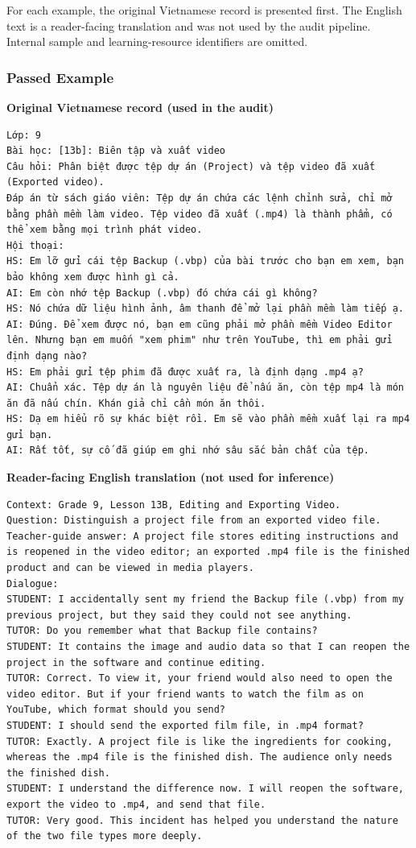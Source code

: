 \documentclass[conference]{IEEEtran}
\begin{document}
For each example, the original Vietnamese record is presented first. The
English text is a reader-facing translation and was not used by the audit
pipeline. Internal sample and learning-resource identifiers are omitted.
\subsubsection{Passed Example}
\noindent\textbf{Original Vietnamese record (used in the audit)}
\begin{Verbatim}[breaklines=true,breakanywhere=true,fontsize=\footnotesize,formatcom=\rmfamily]
Lớp: 9
Bài học: [13b]: Biên tập và xuất video
Câu hỏi: Phân biệt được tệp dự án (Project) và tệp video đã xuất (Exported video).
Đáp án từ sách giáo viên: Tệp dự án chứa các lệnh chỉnh sửa, chỉ mở bằng phần mềm làm video. Tệp video đã xuất (.mp4) là thành phẩm, có thể xem bằng mọi trình phát video.
Hội thoại:
HS: Em lỡ gửi cái tệp Backup (.vbp) của bài trước cho bạn em xem, bạn bảo không xem được hình gì cả.
AI: Em còn nhớ tệp Backup (.vbp) đó chứa cái gì không?
HS: Nó chứa dữ liệu hình ảnh, âm thanh để mở lại phần mềm làm tiếp ạ.
AI: Đúng. Để xem được nó, bạn em cũng phải mở phần mềm Video Editor lên. Nhưng bạn em muốn "xem phim" như trên YouTube, thì em phải gửi định dạng nào?
HS: Em phải gửi tệp phim đã được xuất ra, là định dạng .mp4 ạ?
AI: Chuẩn xác. Tệp dự án là nguyên liệu để nấu ăn, còn tệp mp4 là món ăn đã nấu chín. Khán giả chỉ cần món ăn thôi.
HS: Dạ em hiểu rõ sự khác biệt rồi. Em sẽ vào phần mềm xuất lại ra mp4 gửi bạn.
AI: Rất tốt, sự cố đã giúp em ghi nhớ sâu sắc bản chất của tệp.
\end{Verbatim}
\noindent\textbf{Reader-facing English translation (not used for inference)}
\begin{Verbatim}[breaklines=true,breakanywhere=true,fontsize=\footnotesize,formatcom=\rmfamily]
Context: Grade 9, Lesson 13B, Editing and Exporting Video.
Question: Distinguish a project file from an exported video file.
Teacher-guide answer: A project file stores editing instructions and is reopened in the video editor; an exported .mp4 file is the finished product and can be viewed in media players.
Dialogue:
STUDENT: I accidentally sent my friend the Backup file (.vbp) from my previous project, but they said they could not see anything.
TUTOR: Do you remember what that Backup file contains?
STUDENT: It contains the image and audio data so that I can reopen the project in the software and continue editing.
TUTOR: Correct. To view it, your friend would also need to open the video editor. But if your friend wants to watch the film as on YouTube, which format should you send?
STUDENT: I should send the exported film file, in .mp4 format?
TUTOR: Exactly. A project file is like the ingredients for cooking, whereas the .mp4 file is the finished dish. The audience only needs the finished dish.
STUDENT: I understand the difference now. I will reopen the software, export the video to .mp4, and send that file.
TUTOR: Very good. This incident has helped you understand the nature of the two file types more deeply.
\end{Verbatim}
\end{document}
